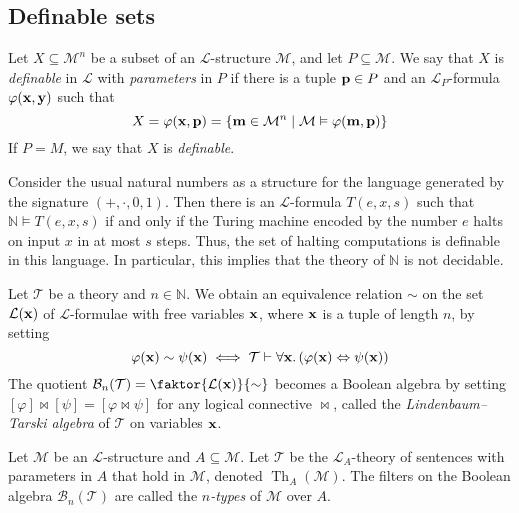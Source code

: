 \subsection{Definable sets}
\begin{definition}
    Let \( X \subseteq \mathcal M^n \) be a subset of an \( \mathcal L \)-structure \( \mathcal M \), and let \( P \subseteq \mathcal M \).
    We say that \( X \) is \emph{definable} in \( \mathcal L \) with \emph{parameters} in \( P \) if there is a tuple \( \vb p \in P \) and an \( \mathcal L_P \)-formula \( \varphi(\vb x, \vb y) \) such that
    \[ X = \varphi(\vb x, \vb p) = \qty{\vb m \in \mathcal M^n \mid \mathcal M \vDash \varphi(\vb m, \vb p)} \]
    If \( P = M \), we say that \( X \) is \emph{definable}.
\end{definition}
\begin{example}
    Consider the usual natural numbers as a structure for the language generated by the signature \( (+, \cdot, 0, 1) \).
    Then there is an \( \mathcal L \)-formula \( T(e, x, s) \) such that \( \mathbb N \vDash T(e, x, s) \) if and only if the Turing machine encoded by the number \( e \) halts on input \( x \) in at most \( s \) steps.
    Thus, the set of halting computations is definable in this language.
    In particular, this implies that the theory of \( \mathbb N \) is not decidable.
\end{example}
\begin{definition}
    Let \( \mathcal T \) be a theory and \( n \in \mathbb N \).
    We obtain an equivalence relation \( \sim \) on the set \( \mathcal L(\vb x) \) of \( \mathcal L \)-formulae with free variables \( \vb x \), where \( \vb x \) is a tuple of length \( n \), by setting
    \[ \varphi(\vb x) \sim \psi(\vb x) \iff \mathcal T \vdash \forall \vb x.\, (\varphi(\vb x) \Leftrightarrow \psi(\vb x)) \]
    The quotient \( \mathcal B_n(\mathcal T) = \faktor{\mathcal L(\vb x)}{\sim} \) becomes a Boolean algebra by setting \( [\varphi] \bowtie [\psi] = [\varphi \bowtie \psi] \) for any logical connective \( \bowtie \), called the \emph{Lindenbaum--Tarski algebra} of \( \mathcal T \) on variables \( \vb x \).
\end{definition}
\begin{definition}
    Let \( \mathcal M \) be an \( \mathcal L \)-structure and \( A \subseteq \mathcal M \).
    Let \( \mathcal T \) be the \( \mathcal L_A \)-theory of sentences with parameters in \( A \) that hold in \( \mathcal M \), denoted \( \operatorname{Th}_A(\mathcal M) \).
    The filters on the Boolean algebra \( \mathcal B_n(\mathcal T) \) are called the \emph{\( n \)-types} of \( \mathcal M \) over \( A \).
\end{definition}
